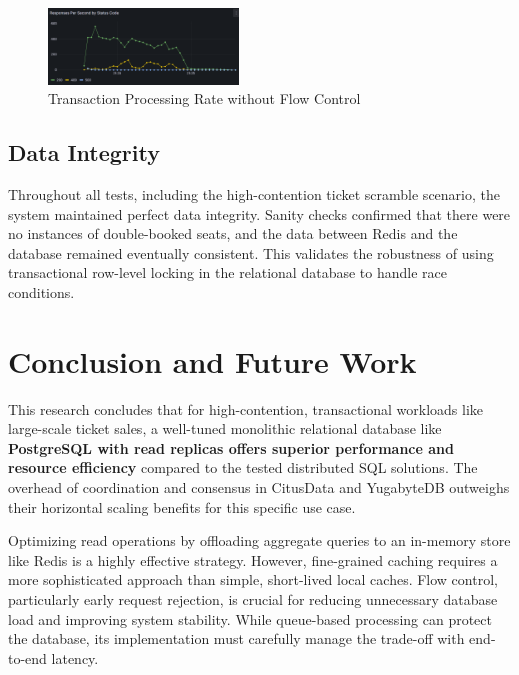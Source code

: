 \begin{itemize}
          \begin{figure}[h!]
              \centering
              \includegraphics[width=0.45\textwidth]{resources/chapter-4/rps-nofc-pg-stress-0.png}
              \caption{Transaction Processing Rate without Flow Control}
              \label{fig:rps-nofc-pg-stress-0}
          \end{figure}
\end{itemize}

\pagebreak

\subsection{Data Integrity}
Throughout all tests, including the high-contention ticket scramble scenario, the system maintained perfect data integrity. Sanity checks confirmed that there were no instances of double-booked seats, and the data between Redis and the database remained eventually consistent. This validates the robustness of using transactional row-level locking in the relational database to handle race conditions.

\section{Conclusion and Future Work}
\label{sec:conclusion}
This research concludes that for high-contention, transactional workloads like large-scale ticket sales, a well-tuned monolithic relational database like \textbf{PostgreSQL with read replicas offers superior performance and resource efficiency} compared to the tested distributed SQL solutions. The overhead of coordination and consensus in CitusData and YugabyteDB outweighs their horizontal scaling benefits for this specific use case.

Optimizing read operations by offloading aggregate queries to an in-memory store like Redis is a highly effective strategy. However, fine-grained caching requires a more sophisticated approach than simple, short-lived local caches. Flow control, particularly early request rejection, is crucial for reducing unnecessary database load and improving system stability. While queue-based processing can protect the database, its implementation must carefully manage the trade-off with end-to-end latency.

